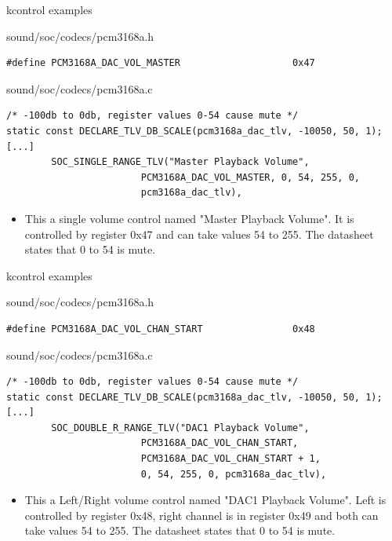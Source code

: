 \begin{frame}[fragile]{kcontrol examples}
  \begin{block}{sound/soc/codecs/pcm3168a.h}
    \fontsize{9}{9}\selectfont
    \begin{verbatim}
#define PCM3168A_DAC_VOL_MASTER                    0x47
    \end{verbatim}
  \end{block}
  \begin{block}{sound/soc/codecs/pcm3168a.c}
    \fontsize{9}{9}\selectfont
    \begin{verbatim}
/* -100db to 0db, register values 0-54 cause mute */
static const DECLARE_TLV_DB_SCALE(pcm3168a_dac_tlv, -10050, 50, 1);
[...]
        SOC_SINGLE_RANGE_TLV("Master Playback Volume",
                        PCM3168A_DAC_VOL_MASTER, 0, 54, 255, 0,
                        pcm3168a_dac_tlv),
    \end{verbatim}
  \end{block}
  \begin{itemize}
  \item This a single volume control named "Master Playback Volume".
    It is controlled by register 0x47 and can take values 54 to 255.
    The datasheet states that 0 to 54 is mute.
  \end{itemize}
\end{frame}

\begin{frame}[fragile]{kcontrol examples}
  \begin{block}{sound/soc/codecs/pcm3168a.h}
    \fontsize{9}{9}\selectfont
    \begin{verbatim}
#define PCM3168A_DAC_VOL_CHAN_START                0x48
    \end{verbatim}
  \end{block}
  \begin{block}{sound/soc/codecs/pcm3168a.c}
    \fontsize{9}{9}\selectfont
    \begin{verbatim}
/* -100db to 0db, register values 0-54 cause mute */
static const DECLARE_TLV_DB_SCALE(pcm3168a_dac_tlv, -10050, 50, 1);
[...]
        SOC_DOUBLE_R_RANGE_TLV("DAC1 Playback Volume",
                        PCM3168A_DAC_VOL_CHAN_START,
                        PCM3168A_DAC_VOL_CHAN_START + 1,
                        0, 54, 255, 0, pcm3168a_dac_tlv),
    \end{verbatim}
  \end{block}
  \begin{itemize}
  \item This a Left/Right volume control named "DAC1 Playback Volume".
    Left is controlled by register 0x48, right channel is in register
    0x49 and both can take values 54 to 255.
    The datasheet states that 0 to 54 is mute.
  \end{itemize}
\end{frame}

